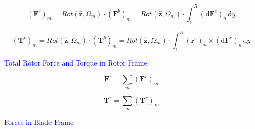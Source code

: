 \begin{equation}
    \left(\mathbf{F}^{r}\right)_m = Rot(\hat{\mathbf{z}}, \Omega_m) \cdot \left(\mathbf{F}^{b}\right)_m = Rot(\hat{\mathbf{z}}, \Omega_m) \cdot \int_\epsilon^R \left( \mathrm{d}\mathbf{F}^{e}\right)_n \, \mathrm{d}y
\end{equation}

\begin{equation}
    \left(\mathbf{T}^{r}\right)_m = Rot(\hat{\mathbf{z}}, \Omega_m) \cdot \left(\mathbf{T}^{b}\right)_m = Rot(\hat{\mathbf{z}}, \Omega_m) \cdot \int_\epsilon^R \left(\mathbf{r}^e \right)_n \times \left( \mathrm{d}\mathbf{F}^{e}\right)_n \, \mathrm{d}y
\end{equation}


\textcolor{blue}{Total Rotor Force and Torque in Rotor Frame}

\begin{equation}
    \mathbf{F}^{r} = \sum_m \left(\mathbf{F}^{r}\right)_m
\end{equation}


\begin{equation}
    \mathbf{T}^{r} = \sum_m \left(\mathbf{T}^{r}\right)_m 
\end{equation}


\textcolor{blue}{Forces in Blade Frame}

